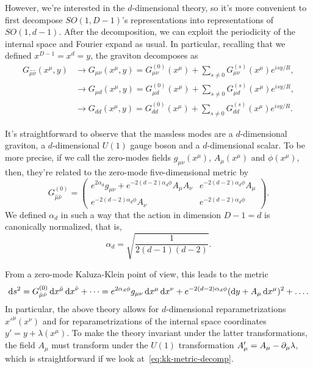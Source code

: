 However, we're interested in the $d$-dimensional theory, so it's more convenient to first decompose $SO(1,D-1)$'s representations into representations of $SO(1,d-1)$. After the decomposition, we can exploit the periodicity of the internal space and Fourier expand as usual. In particular, recalling that we defined $x^{D-1} = x^d = y$, the graviton decomposes as
\begin{align}
    G_{\hat{\mu}\hat{\nu}} (x^\mu, y) 
    &\to G_{\mu\nu}(x^\mu, y) = G^{(0)}_{{\mu} {\nu}} (x^\mu)+ \sum_{s \neq 0} G^{(s)}_{{\mu} {\nu}} (x^\mu) e^{is y / R} ,\\
    &\to G_{\mu d} (x^\mu, y) = G^{(0)}_{{\mu} {d}} (x^\mu)+ \sum_{s \neq 0} G^{(s)}_{{\mu} {d}} (x^\mu) e^{is y / R} ,\\
    &\to G_{dd} (x^\mu, y) = G^{(0)}_{{d} {d}} (x^\mu)+ \sum_{s \neq 0} G^{(s)}_{{d} {d}} (x^\mu) e^{is y / R} .
\end{align}

It's straightforward to observe that the massless modes are a $d$-dimensional graviton, a $d$-dimensional $U(1)$ gauge boson and a $d$-dimensional scalar. To be more precise, if we call the zero-modes fields $g_{\mu\nu}(x^\mu)$, $A_\mu(x^\mu)$ and $\phi(x^\mu)$, then, they're related to the zero-mode five-dimensional metric by
\begin{equation}
    G^{(0)}_{\hat{\mu}\hat{\nu}} = 
    \begin{pmatrix}
        e^{2\alpha_d} g_{\mu\nu} + e^{-2(d-2)\alpha_d \phi} A_\mu A_\nu & e^{-2(d-2)\alpha_d \phi} A_\mu \\
        e^{-2(d-2)\alpha_d \phi} A_\nu & e^{-2(d-2)\alpha_d \phi}
    \end{pmatrix} .
\end{equation}
We defined $\alpha_d$ in such a way that the action in dimension $D-1 = d$ is canonically normalized, that is,
\begin{equation}
    \alpha_d = \sqrt{\frac{1}{2(d-1)(d-2)}} .
\end{equation}

From a zero-mode Kaluza-Klein point of view, this leads to the metric
\begin{equation}\label{eq:kk-metric-decomp}
    \mathop{}\!\mathrm{d} s^2 = G^{(0)}_{\hat{\mu}\hat{\nu}} \mathop{}\!\mathrm{d} x^{\hat{\mu}} \mathop{}\!\mathrm{d} x^{\hat{\nu}} + \dots = e^{2\alpha_d \phi} g_{\mu\nu} \mathop{}\!\mathrm{d} x^\mu \mathop{}\!\mathrm{d} x^\nu + e^{-2(d-2)\alpha_d \phi} (\mathop{}\!\mathrm{d} y + A_\mu \mathop{}\!\mathrm{d} x^\mu)^2 + \dots.
\end{equation}
In particular, the above theory allows for $d$-dimensional reparametrizations $x'^\mu(x^\nu)$ and for reparametrizations of the internal space coordinates $y' = y + \lambda(x^\mu)$. To make the theory invariant under the latter transformations, the field $A_\mu$ must transform under the $U(1)$ transformation $A'_\mu = A_\mu - \partial_\mu \lambda$, which is straightforward if we look at~\eqref{eq:kk-metric-decomp}.

